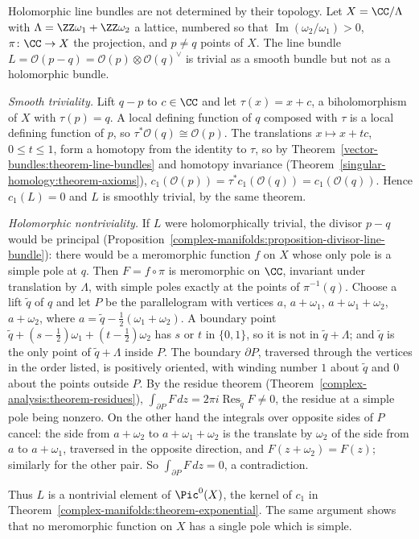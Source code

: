 \begin{counterexample}\label{complex-manifolds:counterexample-topologically-trivial}
Holomorphic line bundles are not determined by their topology. Let $X = \CC/\Lambda$ with $\Lambda = \ZZ\omega_1 + \ZZ\omega_2$ a lattice, numbered so that $\operatorname{Im}(\omega_2/\omega_1) > 0$, $\pi \colon \CC \to X$ the projection, and $p \neq q$ points of $X$. The line bundle
$L = \mathcal{O}(p - q) = \mathcal{O}(p) \otimes \mathcal{O}(q)^\vee$ is trivial as a smooth bundle but not as a holomorphic bundle.

\emph{Smooth triviality.} Lift $q - p$ to $c \in \CC$ and let $\tau(x) = x + c$, a biholomorphism of $X$ with $\tau(p) = q$. A local defining function of $q$ composed with $\tau$ is a local defining function of $p$, so
$\tau^*\mathcal{O}(q) \cong \mathcal{O}(p)$. The translations $x \mapsto x + tc$, $0 \leq t \leq 1$, form a homotopy from the identity to $\tau$, so by Theorem~\ref{vector-bundles:theorem-line-bundles} and homotopy
invariance (Theorem~\ref{singular-homology:theorem-axioms}), $c_1(\mathcal{O}(p)) = \tau^*c_1(\mathcal{O}(q)) = c_1(\mathcal{O}(q))$. Hence $c_1(L) = 0$ and $L$ is smoothly trivial, by the same theorem.

\emph{Holomorphic nontriviality.} If $L$ were holomorphically trivial, the divisor $p - q$ would be principal (Proposition~\ref{complex-manifolds:proposition-divisor-line-bundle}): there would be a meromorphic
function $f$ on $X$ whose only pole is a simple pole at $q$. Then $F = f \circ \pi$ is meromorphic on $\CC$, invariant under translation by $\Lambda$, with simple poles exactly at the points of $\pi^{-1}(q)$. Choose a lift
$\tilde q$ of $q$ and let $P$ be the parallelogram with vertices $a$, $a + \omega_1$, $a + \omega_1 + \omega_2$, $a + \omega_2$, where $a = \tilde q - \frac12(\omega_1 + \omega_2)$. A boundary point
$\tilde q + (s - \frac12)\omega_1 + (t - \frac12)\omega_2$ has $s$ or $t$ in $\{0, 1\}$, so it is not in $\tilde q + \Lambda$; and $\tilde q$ is the only point of $\tilde q + \Lambda$ inside $P$. The boundary $\partial P$, traversed through the vertices in the order listed, is positively oriented, with winding number $1$ about
$\tilde q$ and $0$ about the points outside $P$. By the residue theorem
(Theorem~\ref{complex-analysis:theorem-residues}), $\int_{\partial P}F\,dz = 2\pi i\operatorname{Res}_{\tilde q}F \neq 0$, the residue at a simple pole being nonzero. On the other hand the integrals over opposite sides of $P$
cancel: the side from $a + \omega_2$ to $a + \omega_1 + \omega_2$ is the translate by $\omega_2$ of the side from $a$ to $a + \omega_1$, traversed in the opposite direction, and $F(z + \omega_2) = F(z)$; similarly for the
other pair. So $\int_{\partial P}F\,dz = 0$, a contradiction.

Thus $L$ is a nontrivial element of $\Pic^0(X)$, the kernel of $c_1$ in Theorem~\ref{complex-manifolds:theorem-exponential}. The same argument shows that no meromorphic function on $X$ has a single pole which is simple.
\end{counterexample}

